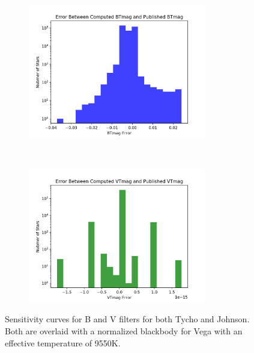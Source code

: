 \documentclass[]{DINOReportMemo}
\begin{document}
\begin{figure}[t!]
    \centering
    \begin{subfigure}
        \centering
        \includegraphics[height=2.3in]{btmag_hist}
    \end{subfigure}%
    ~ 
    \begin{subfigure}
        \centering
        \includegraphics[height=2.3in]{vtmag_hist}
    \end{subfigure}
    \caption{Sensitivity curves for B and V filters for both Tycho and Johnson. Both are overlaid with a normalized blackbody for Vega with an effective temperature of 9550K.}
\end{figure}
\end{document}
